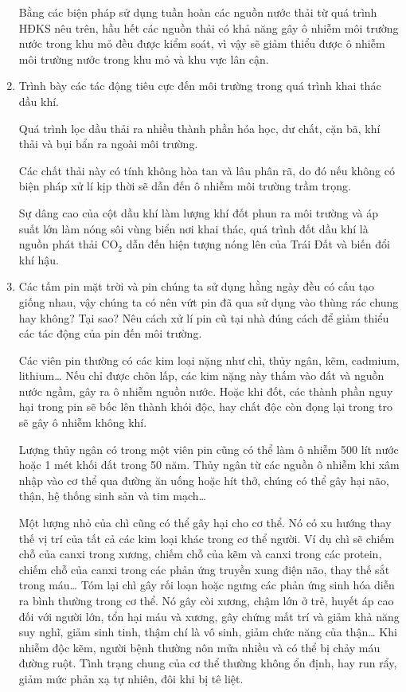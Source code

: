 \begin{enumerate}[label=\bfseries Câu \arabic*:]
{		Bằng các biện pháp sử dụng tuần hoàn các nguồn nước thải từ quá trình HĐKS nêu trên, hầu hết các nguồn thải có khả năng gây ô nhiễm môi trường nước trong khu mỏ đều được kiểm soát, vì vậy sẽ giảm thiểu được ô nhiễm môi trường nước trong khu mỏ và khu vực lân cận.
	}
	
	\item {}
	
	
	{
		Trình bày các tác động tiêu cực đến môi trường trong quá trình khai thác dầu khí.
	}
	
	\hideall
	{
		Quá trình lọc dầu thải ra nhiều thành phần hóa học, dư chất, cặn bã, khí thải và bụi bẩn ra ngoài môi trường.
		
		Các chất thải này có tính không hòa tan và lâu phân rã, do đó nếu không có biện pháp xử lí kịp thời sẽ dẫn đến ô nhiễm môi trường trầm trọng.
		
		Sự dâng cao của cột dầu khí làm lượng khí đốt phun ra môi trường và áp suất lớn làm nóng sôi vùng biển nơi khai thác, quá trình đốt dầu khí là nguồn phát thải CO$_2$ dẫn đến hiện tượng nóng lên của Trái Đất và biến đổi khí hậu.
	}
	\item {}
	
	
	{
		Các tấm pin mặt trời và pin chúng ta sử dụng hằng ngày đều có cấu tạo giống nhau, vậy chúng ta có nên vứt pin đã qua sử dụng vào thùng rác chung hay không? Tại sao? Nêu cách xử lí pin cũ tại nhà đúng cách để giảm thiểu các tác động của pin đến môi trường.
	}
	
	\hideall
	{
		Các viên pin thường có các kim loại nặng như chì, thủy ngân, kẽm, cadmium, lithium… Nếu chỉ được chôn lấp, các kim nặng này thấm vào đất và nguồn nước ngầm, gây ra ô nhiễm nguồn nước. Hoặc khi đốt, các thành phần nguy hại trong pin sẽ bốc lên thành khói độc, hay chất độc còn đọng lại trong tro sẽ gây ô nhiễm không khí.
		
		Lượng thủy ngân có trong một viên pin cũng có thể làm ô nhiễm 500 lít nước hoặc 1 mét khối đất trong 50 năm. Thủy ngân từ các nguồn ô nhiễm khi xâm nhập vào cơ thể qua đường ăn uống hoặc hít thở, chúng có thể gây hại não, thận, hệ thống sinh sản và tim mạch…
		
		Một lượng nhỏ của chì cũng có thể gây hại cho cơ thể. Nó có xu hướng thay thế vị trí của tất cả các kim loại khác trong cơ thể người. Ví dụ chì sẽ chiếm chỗ của canxi trong xương, chiếm chỗ của kẽm và canxi trong các protein, chiếm chỗ của canxi trong các phản ứng truyền xung điện não, thay thế sắt trong máu… Tóm lại chì gây rối loạn hoặc ngưng các phản ứng sinh hóa diễn ra bình thường trong cơ thể. Nó gây còi xương, chậm lớn ở trẻ, huyết áp cao đối với người lớn, tổn hại máu và xương, gây chứng mất trí và giảm khả năng suy nghĩ, giảm sinh tinh, thậm chí là vô sinh, giảm chức năng của thận…
		Khi nhiễm độc kẽm, người bệnh thường nôn mửa nhiều và có thể bị chảy máu đường ruột. Tình trạng chung của cơ thể thường không ổn định, hay run rẩy, giảm mức phản xạ tự nhiên, đôi khi bị tê liệt.
		
}
\end{enumerate}
